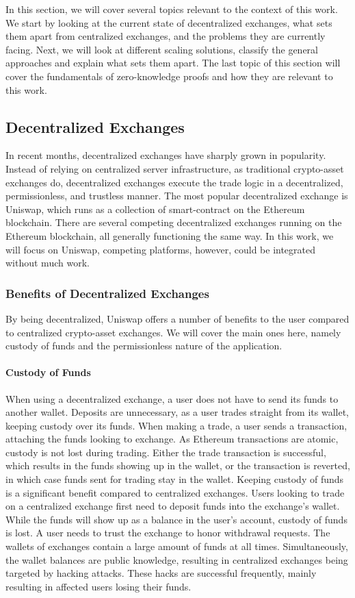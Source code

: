 \documentclass[../../thesis.tex]{subfiles}
\begin{document}
In this section, we will cover several topics relevant to the context of this work. We start by looking at the current state of decentralized exchanges, what sets them apart from centralized exchanges, and the problems they are currently facing. Next, we will look at different scaling solutions, classify the general approaches and explain what sets them apart. The last topic of this section will cover the fundamentals of zero-knowledge proofs and how they are relevant to this work.

\subsection{Decentralized Exchanges}
In recent months, decentralized exchanges have sharply grown in popularity. Instead of relying on centralized server infrastructure, as traditional crypto-asset exchanges do, decentralized exchanges execute the trade logic in a decentralized, permissionless, and trustless manner. The most popular decentralized exchange is Uniswap, which runs as a collection of smart-contract on the Ethereum blockchain. There are several competing decentralized exchanges running on the Ethereum blockchain, all generally functioning the same way. In this work, we will focus on Uniswap, competing platforms, however, could be integrated without much work. 

\subsubsection{Benefits of Decentralized Exchanges}
By being decentralized, Uniswap offers a number of benefits to the user compared to centralized crypto-asset exchanges. We will cover the main ones here, namely custody of funds and the permissionless nature of the application.

\paragraph{Custody of Funds}
When using a decentralized exchange, a user does not have to send its funds to another wallet. Deposits are unnecessary, as a user trades straight from its wallet, keeping custody over its funds. When making a trade, a user sends a transaction, attaching the funds looking to exchange. As Ethereum transactions are atomic, custody is not lost during trading. Either the trade transaction is successful, which results in the funds showing up in the wallet, or the transaction is reverted, in which case funds sent for trading stay in the wallet. Keeping custody of funds is a significant benefit compared to centralized exchanges. Users looking to trade on a centralized exchange first need to deposit funds into the exchange's wallet. While the funds will show up as a balance in the user's account, custody of funds is lost. A user needs to trust the exchange to honor withdrawal requests.  The wallets of exchanges contain a large amount of funds at all times. Simultaneously, the wallet balances are public knowledge, resulting in centralized exchanges being targeted by hacking attacks. These hacks are successful frequently, mainly resulting in affected users losing their funds. 
\end{document}

